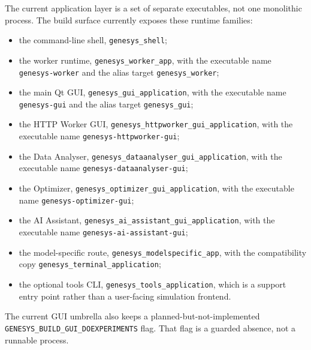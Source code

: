 The current application layer is a set of separate executables, not one
monolithic process. The build surface currently exposes these runtime
families:
\begin{itemize}
\item the command-line shell, \texttt{genesys\_shell};
\item the worker runtime, \texttt{genesys\_worker\_app}, with the executable
name \texttt{genesys-worker} and the alias target \texttt{genesys\_worker};
\item the main Qt GUI, \texttt{genesys\_gui\_application}, with the executable
name \texttt{genesys-gui} and the alias target \texttt{genesys\_gui};
\item the HTTP Worker GUI, \texttt{genesys\_httpworker\_gui\_application}, with
the executable name \texttt{genesys-httpworker-gui};
\item the Data Analyser, \texttt{genesys\_dataanalyser\_gui\_application}, with
the executable name \texttt{genesys-dataanalyser-gui};
\item the Optimizer, \texttt{genesys\_optimizer\_gui\_application}, with the
executable name \texttt{genesys-optimizer-gui};
\item the AI Assistant, \texttt{genesys\_ai\_assistant\_gui\_application}, with
the executable name \texttt{genesys-ai-assistant-gui};
\item the model-specific route, \texttt{genesys\_modelspecific\_app}, with the
compatibility copy \texttt{genesys\_terminal\_application};
\item the optional tools CLI, \texttt{genesys\_tools\_application}, which is a
support entry point rather than a user-facing simulation frontend.
\end{itemize}

The current GUI umbrella also keeps a planned-but-not-implemented
\texttt{GENESYS\_BUILD\_GUI\_DOEXPERIMENTS} flag. That flag is a guarded
absence, not a runnable process.


